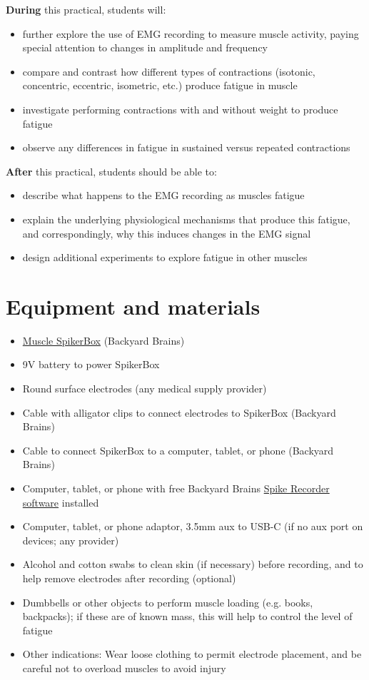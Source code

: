 \documentclass{article}
\begin{document}
\textbf{During} this practical, students will:

\begin{itemize}
\item further explore the use of EMG recording to measure muscle activity, paying special attention to changes in amplitude and frequency
\item compare and contrast how different types of contractions (isotonic, concentric, eccentric, isometric, etc.) produce fatigue in muscle
\item investigate performing contractions with and without weight to produce fatigue
\item observe any differences in fatigue in sustained versus repeated contractions
\end{itemize}

\textbf{After} this practical, students should be able to:

\begin{itemize}
\item describe what happens to the EMG recording as muscles fatigue
\item explain the underlying physiological mechanisms that produce this fatigue, and correspondingly, why this induces changes in the EMG signal
\item design additional experiments to explore fatigue in other muscles
\end{itemize}

\section{Equipment and materials}

\begin{itemize}
\item \href{https://backyardbrains.com/products/muscle-spikerbox}{Muscle SpikerBox} (Backyard Brains)
\item 9V battery to power SpikerBox
\item Round surface electrodes (any medical supply provider)
\item Cable with alligator clips to connect electrodes to SpikerBox (Backyard Brains)
\item Cable to connect SpikerBox to a computer, tablet, or phone (Backyard Brains)
\item Computer, tablet, or phone with free Backyard Brains \href{https://backyardbrains.com/products/byb-spike-recorder}{Spike Recorder software} installed
\item Computer, tablet, or phone adaptor, 3.5mm aux to USB-C (if no aux port on devices; any provider)
\item Alcohol and cotton swabs to clean skin (if necessary) before recording, and to help remove electrodes after recording (optional)
\item Dumbbells or other objects to perform muscle loading (e.g. books, backpacks); if these are of known mass, this will help to control the level of fatigue
\item Other indications: Wear loose clothing to permit electrode placement, and be careful not to overload muscles to avoid injury
\end{itemize}
\end{document}
